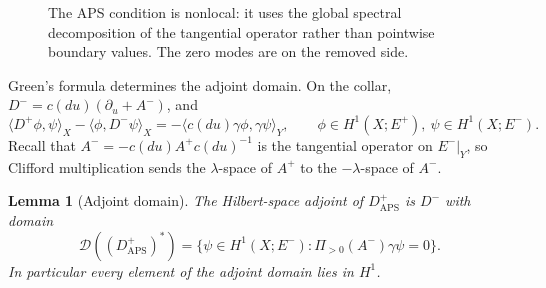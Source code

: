 \documentclass[12pt,oneside,reqno]{article}
\theoremstyle{plain}
\newtheorem{lemma}[theorem]{Lemma}
\theoremstyle{definition}
\theoremstyle{remark}
\begin{document}
\begin{figure}[htbp]
\centering
{}
\caption[APS spectral boundary projection]{The APS condition is
nonlocal: it uses the global spectral decomposition of the tangential
operator rather than pointwise boundary values.  The zero modes are on
the removed side.}
\end{figure}

Green's formula determines the adjoint domain.  On the collar,
\(D^-=c(du)(\partial_u+A^-)\), and
\[
 \langle D^+\phi,\psi\rangle_X-\langle \phi,D^-\psi\rangle_X
 =-\langle c(du)\gamma\phi,\gamma\psi\rangle_Y,
 \qquad \phi\in H^1(X;E^+),\ \psi\in H^1(X;E^-).
\]
Recall that \(A^-=-c(du)A^+c(du)^{-1}\) is the tangential operator on
\(E^-|_Y\), so Clifford multiplication sends the \(\lambda\)-space
of \(A^+\) to the \(-\lambda\)-space of \(A^-\).

\begin{lemma}[Adjoint domain]\label{lem:APS-adjoint}
The Hilbert-space adjoint of \(D^+_{\mathrm{APS}}\) is \(D^-\) with domain
\[
 \mathcal D((D^+_{\mathrm{APS}})^*)
 =\{\psi\in H^1(X;E^-):\Pi_{>0}(A^-)\gamma\psi=0\}.
\]
In particular every element of the adjoint domain lies in \(H^1\).
\end{lemma}
\end{document}

